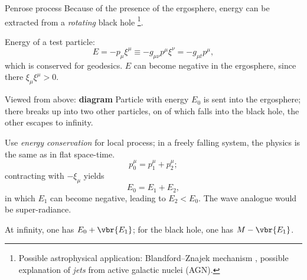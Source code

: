 \begin{nameddef}{Penrose process}
Because of the presence of the ergosphere, energy can be extracted from a
\emph{rotating} black hole \citeauthor{Penrose:1969pc}
\cite{Penrose2002,PENROSEFLOYD1971}\footnote{%
Possible astrophysical application: Blandford--Znajek mechanism
\cite{Blandford01071977}, possible explanation of \emph{%
jets} from active galactic nuclei (AGN).}.

Energy of a test particle:
\begin{equation}
E = - p_\mu \xi^\mu \equiv - g_{\mu\nu} p^\mu \xi^\nu = -g_{\mu t}p^\mu,
\end{equation}
which is conserved for geodesics. $E$ can become negative in the ergosphere,
since there $\xi_\mu \xi^\mu > 0$.

Viewed from above: \textbf{diagram}
Particle with energy $E_0$ is sent into the ergosphere; there breaks up into
two other particles, on of which falls into the black hole, the other escapes
to infinity.

Use \emph{energy conservation} for local process; in a freely falling system,
the physics is the same as in flat space-time.
\begin{equation}
p_0^\mu = p_1^\mu + p_2^\mu;
\end{equation}
contracting with $-\xi_\mu$ yields
\begin{equation}
E_0 = E_1 + E_2,
\end{equation}
in which $E_1$ can become negative, leading to $E_2 < E_0$. The wave analogue
would be super-radiance.

At infinity, one has $E_0 + \vbr{E_1}$; for the black hole, one has $M -
\vbr{E_1}$.
\end{nameddef} %

